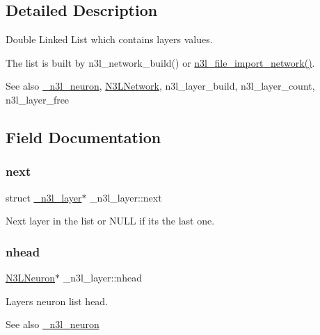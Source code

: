 \subsection{Detailed Description}
Double Linked List which contains layer\textquotesingle{}s values. 

The list is built by n3l\+\_\+network\+\_\+build() or \hyperlink{n3__file_8c_a4fef76548ed87845dceafaa9527a83d0}{n3l\+\_\+file\+\_\+import\+\_\+network()}.

\begin{DoxySeeAlso}{See also}
\hyperlink{struct__n3l__neuron}{\+\_\+n3l\+\_\+neuron}, \hyperlink{structN3LNetwork}{N3\+L\+Network}, n3l\+\_\+layer\+\_\+build, n3l\+\_\+layer\+\_\+count, n3l\+\_\+layer\+\_\+free 
\end{DoxySeeAlso}


\subsection{Field Documentation}
\mbox{\label{struct__n3l__layer_afada0fe8b2a403d5aeeb71b0ae7f8aae}} 
\subsubsection{\texorpdfstring{next}{next}}
{\footnotesize\ttfamily struct \hyperlink{struct__n3l__layer}{\+\_\+n3l\+\_\+layer}$\ast$ \+\_\+n3l\+\_\+layer\+::next}

Next layer in the list or N\+U\+LL if it\textquotesingle{}s the last one. \mbox{\label{struct__n3l__layer_a263e7831428a3b535964412a1d802c4e}} 
\subsubsection{\texorpdfstring{nhead}{nhead}}
{\footnotesize\ttfamily \hyperlink{n3__header_8h_a621b1df037f351bd3542298933e5799a}{N3\+L\+Neuron}$\ast$ \+\_\+n3l\+\_\+layer\+::nhead}

Layer\textquotesingle{}s neuron list head. \begin{DoxySeeAlso}{See also}
\hyperlink{struct__n3l__neuron}{\+\_\+n3l\+\_\+neuron} 
\end{DoxySeeAlso}
\mbox{\label{struct__n3l__layer_aa120fe4ab0898e733b8d6940b467ebc3}} 
